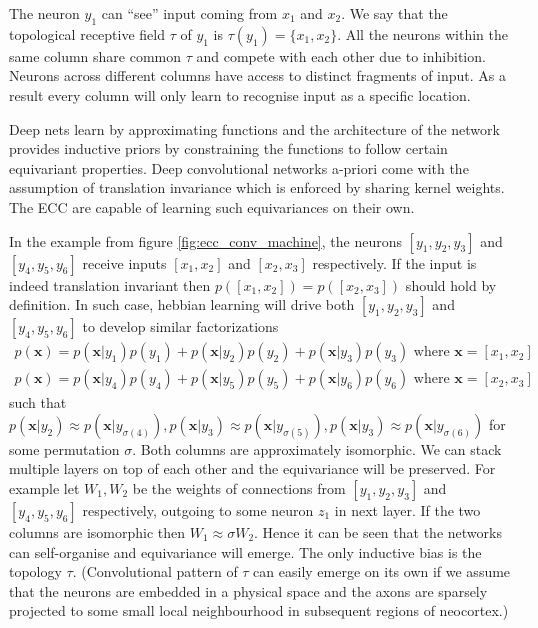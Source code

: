 \documentclass[12pt]{article}
\begin{document}
The neuron $y_1$ can ``see'' input coming from $x_1$ and $x_2$. We say that the topological receptive field $\tau$ of $y_1$ is $\tau(y_1)=\{x_1,x_2\}$. All the neurons
within the same column share common $\tau$ and compete with each other due to inhibition. Neurons across different columns have access to distinct fragments of input. As a result every column will only learn to recognise input as a specific location. 

Deep nets learn by approximating functions and the architecture of the network provides inductive priors by constraining the functions to follow certain equivariant properties. Deep convolutional networks a-priori come with the assumption of translation invariance which is enforced by sharing kernel weights. The ECC are capable of learning such equivariances on their own.

In the example from figure \ref{fig:ecc_conv_machine}, the neurons $[y_1,y_2,y_3]$ and $[y_4,y_5,y_6]$ receive inputs $[x_1,x_2]$ and $[x_2,x_3]$ respectively. If the input is indeed translation invariant then $p([x_1,x_2])=p([x_2,x_3])$ should hold by definition. In such case, hebbian learning will drive both $[y_1,y_2,y_3]$ and $[y_4,y_5,y_6]$ to develop similar factorizations
\begin{gather*}
p(\boldsymbol{x}) = p(\boldsymbol{x}|y_1)p(y_1)+  p(\boldsymbol{x}|y_2)p(y_2)+  p(\boldsymbol{x}|y_3)p(y_3)\text{ where }\boldsymbol{x}=[x_1,x_2] \\
p(\boldsymbol{x}) = p(\boldsymbol{x}|y_4)p(y_4)+  p(\boldsymbol{x}|y_5)p(y_5)+  p(\boldsymbol{x}|y_6)p(y_6)\text{ where }\boldsymbol{x}=[x_2,x_3]
\end{gather*}
such that $p(\boldsymbol{x}|y_2) \approx p(\boldsymbol{x}|y_{\sigma(4)}), p(\boldsymbol{x}|y_{3}) \approx p(\boldsymbol{x}|y_{\sigma(5)}),p(\boldsymbol{x}|y_3) \approx p(\boldsymbol{x}|y_{\sigma(6)}) $ for some permutation $\sigma$. Both columns are approximately isomorphic. We can stack multiple layers on top of each other and the equivariance will be preserved. For example let $W_1,W_2$ be the weights of connections from $[y_1,y_2,y_3]$ and   $[y_4,y_5,y_6]$ respectively, outgoing to some neuron $z_1$ in next layer. If the two columns are isomorphic then $W_1\approx\sigma W_2$. Hence it can be seen that the networks can self-organise and equivariance will emerge. The only inductive bias is the topology $\tau$. (Convolutional pattern of $\tau$ can easily emerge on its own if we assume that the neurons are embedded in a physical space and the axons are sparsely projected to some small local neighbourhood in subsequent regions of neocortex.)
\end{document}
